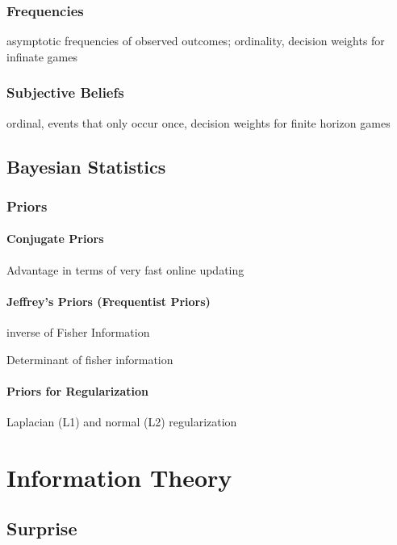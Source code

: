 \documentclass[]{article}
\begin{document}
\subsection{Frequencies}

asymptotic frequencies of observed outcomes; ordinality, decision
weights for infinate games

\subsection{Subjective Beliefs}

ordinal, events that only occur once, decision weights for finite
horizon games

\section{Bayesian Statistics}

\subsection{Priors}

\subsubsection{Conjugate Priors}

Advantage in terms of very fast online updating

\subsubsection{Jeffrey's Priors (Frequentist Priors)}

inverse of Fisher Information

Determinant of fisher information

\subsubsection{Priors for Regularization}

Laplacian (L1) and normal (L2) regularization

\chapter{Information Theory}

\section{Surprise}
\end{document}
